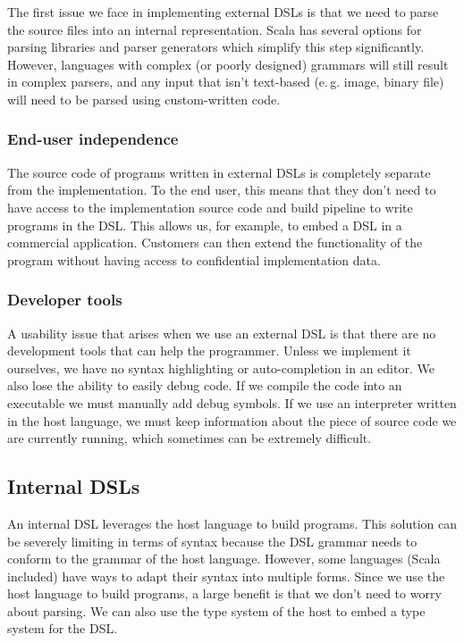 The first issue we face in implementing external DSLs is that we need to parse the source files into an internal representation.
Scala has several options for parsing libraries and parser generators which simplify this step significantly.
However, languages with complex (or poorly designed) grammars will still result in complex parsers, and any input that isn't text-based (e.\,g. image, binary file) will need to be parsed using custom-written code.

\subsubsection{End-user independence}

The source code of programs written in external DSLs is completely separate from the implementation.
To the end user, this means that they don't need to have access to the implementation source code and build pipeline to write programs in the DSL.
This allows us, for example, to embed a DSL in a commercial application.
Customers can then extend the functionality of the program without having access to confidential implementation data.

\subsubsection{Developer tools}

A usability issue that arises when we use an external DSL is that there are no development tools that can help the programmer.
Unless we implement it ourselves, we have no syntax highlighting or auto-completion in an editor.
We also lose the ability to easily debug code.
If we compile the code into an executable we must manually add debug symbols.
If we use an interpreter written in the host language, we must keep information about the piece of source code we are currently running, which sometimes can be extremely difficult.

\subsection{Internal DSLs}

An internal DSL leverages the host language to build programs.
This solution can be severely limiting in terms of syntax because the DSL grammar needs to conform to the grammar of the host language.
However, some languages (Scala included) have ways to adapt their syntax into multiple forms.
Since we use the host language to build programs, a large benefit is that we don't need to worry about parsing.
We can also use the type system of the host to embed a type system for the DSL.


